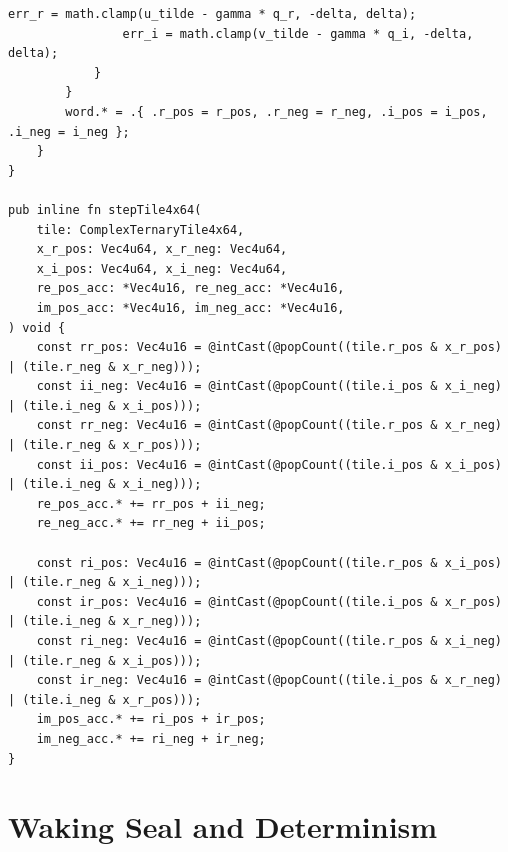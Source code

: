 \documentclass[10pt, twocolumn, a4paper]{article}
\begin{document}
\begin{lstlisting}[caption={Zig $\Sigma\Delta$ bit-plane packer and 4-row SIMD contraction kernel. The packer uses \texttt{f32} arithmetic; see Section~\ref{sec:seal}.}]
                err_r = math.clamp(u_tilde - gamma * q_r, -delta, delta);
                err_i = math.clamp(v_tilde - gamma * q_i, -delta, delta);
            }
        }
        word.* = .{ .r_pos = r_pos, .r_neg = r_neg, .i_pos = i_pos, .i_neg = i_neg };
    }
}

pub inline fn stepTile4x64(
    tile: ComplexTernaryTile4x64,
    x_r_pos: Vec4u64, x_r_neg: Vec4u64,
    x_i_pos: Vec4u64, x_i_neg: Vec4u64,
    re_pos_acc: *Vec4u16, re_neg_acc: *Vec4u16,
    im_pos_acc: *Vec4u16, im_neg_acc: *Vec4u16,
) void {
    const rr_pos: Vec4u16 = @intCast(@popCount((tile.r_pos & x_r_pos) | (tile.r_neg & x_r_neg)));
    const ii_neg: Vec4u16 = @intCast(@popCount((tile.i_pos & x_i_neg) | (tile.i_neg & x_i_pos)));
    const rr_neg: Vec4u16 = @intCast(@popCount((tile.r_pos & x_r_neg) | (tile.r_neg & x_r_pos)));
    const ii_pos: Vec4u16 = @intCast(@popCount((tile.i_pos & x_i_pos) | (tile.i_neg & x_i_neg)));
    re_pos_acc.* += rr_pos + ii_neg;
    re_neg_acc.* += rr_neg + ii_pos;

    const ri_pos: Vec4u16 = @intCast(@popCount((tile.r_pos & x_i_pos) | (tile.r_neg & x_i_neg)));
    const ir_pos: Vec4u16 = @intCast(@popCount((tile.i_pos & x_r_pos) | (tile.i_neg & x_r_neg)));
    const ri_neg: Vec4u16 = @intCast(@popCount((tile.r_pos & x_i_neg) | (tile.r_neg & x_i_pos)));
    const ir_neg: Vec4u16 = @intCast(@popCount((tile.i_pos & x_r_neg) | (tile.i_neg & x_r_pos)));
    im_pos_acc.* += ri_pos + ir_pos;
    im_neg_acc.* += ri_neg + ir_neg;
}
\end{lstlisting}

\section{Waking Seal and Determinism}\label{sec:seal}
\end{document}
